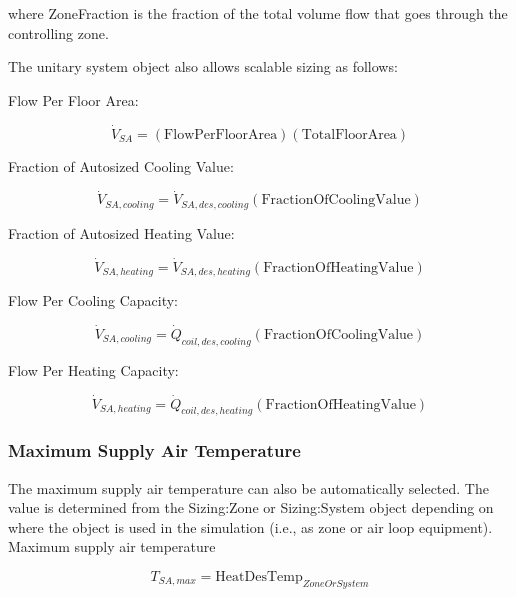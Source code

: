 where ZoneFraction is the fraction of the total volume flow that goes through the controlling zone.

The unitary system object also allows scalable sizing as follows:

Flow Per Floor Area:

\begin{equation}
\dot V_{SA} = \left(\text{FlowPerFloorArea}\right)\left(\text{TotalFloorArea}\right)
\end{equation}

Fraction of Autosized Cooling Value:

\begin{equation}
\dot V_{SA,cooling} = \dot V_{SA,des,cooling}\left(\text{FractionOfCoolingValue}\right)
\end{equation}

Fraction of Autosized Heating Value:

\begin{equation}
\dot V_{SA,heating} = \dot V_{SA,des,heating}\left(\text{FractionOfHeatingValue}\right)
\end{equation}

Flow Per Cooling Capacity:

\begin{equation}
\dot V_{SA,cooling} = \dot Q_{coil,des,cooling}\left(\text{FractionOfCoolingValue}\right)
\end{equation}

Flow Per Heating Capacity:

\begin{equation}
\dot V_{SA,heating} = \dot Q_{coil,des,heating}\left(\text{FractionOfHeatingValue}\right)
\end{equation}

\subsubsection{Maximum Supply Air Temperature}\label{maximum-supply-air-temperature}

The maximum supply air temperature can also be automatically selected. The value is determined from the Sizing:Zone or Sizing:System object depending on where the object is used in the simulation (i.e., as zone or air loop equipment). Maximum supply air temperature

\begin{equation}
T_{SA,max} = \text{HeatDesTemp}_{ZoneOrSystem}
\end{equation}

